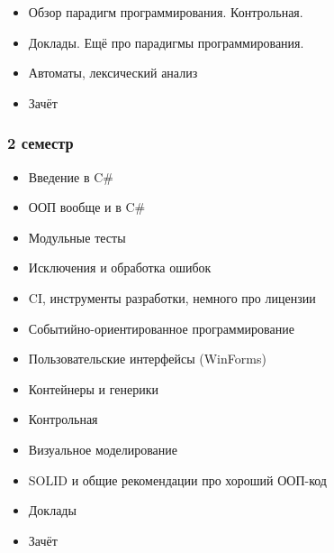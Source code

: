 \documentclass[xetex,mathserif,serif]{beamer}
\begin{document}
\begin{frame}
\begin{scriptsize}
\begin{itemize}
\begin{scriptsize}
\begin{itemize}
                        \item Обзор парадигм программирования. Контрольная.
                        \item Доклады. Ещё про парадигмы программирования.
                        \item Автоматы, лексический анализ
                        \item Зачёт
                    \end{itemize}
                \end{scriptsize}
            \end{itemize}
        \end{scriptsize}
    \end{frame}

    \begin{frame}
        \frametitle{2 семестр}
        \begin{scriptsize}
            \begin{itemize}
                \item Введение в C\#
                \item ООП вообще и в C\#
                \item Модульные тесты
                \item Исключения и обработка ошибок
                \item CI, инструменты разработки, немного про лицензии
                \item Событийно-ориентированное программирование
                \item Пользовательские интерфейсы (WinForms)
                \item Контейнеры и генерики
                \item Контрольная
                \item Визуальное моделирование
                \item SOLID и общие рекомендации про хороший ООП-код
                \item Доклады
                \item Зачёт
            \end{itemize}
        \end{scriptsize}
    \end{frame}
\end{document}
